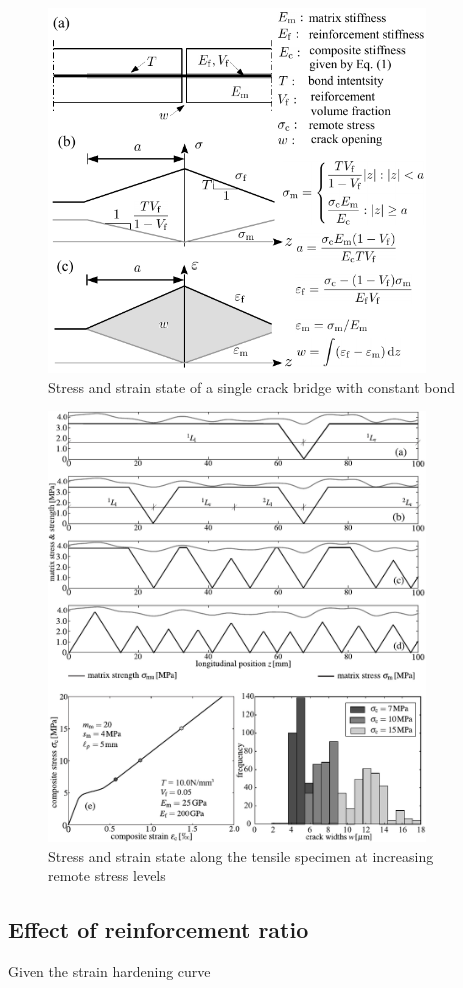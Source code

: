 \documentclass[main.tex]{subfiles}
\begin{document}
\begin{figure}
    \centering
        \includegraphics[width=10cm]{fig/simple_crack_bridge.pdf}
        \caption{Stress and strain state of a single crack bridge with constant bond}
        \label{FIGSingleCrackBridge}
\end{figure}


\begin{figure}
    \centering
        \includegraphics[width=10cm]{fig/crack_evolution.pdf}
        \caption{Stress and strain state along the tensile specimen at increasing remote stress levels}
        \label{FIGMutipleCracking}
\end{figure}

\subsection{Effect of reinforcement ratio}

Given the strain hardening curve

\begin{align}
    \label{}
\end{align}
\end{document}
